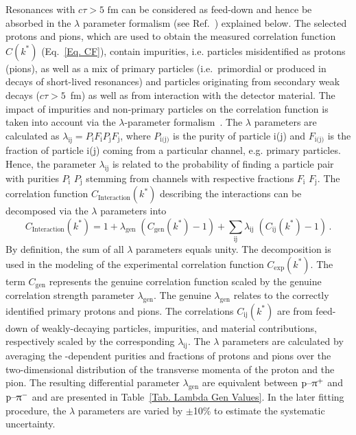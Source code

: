 \documentclass[ALICE,manyauthors]{cernphprep}
\begin{document}
Resonances with $c\tau>5\text{ fm}$ can be considered as feed-down and hence be absorbed in the $\lambda$ parameter formalism (see Ref.~\cite{ALICE:2023sjd}) explained below. The selected protons and pions, which are used to obtain the measured correlation function $C(k^*)$ (Eq.~\eqref{Eq. CF}), contain impurities, i.e. particles misidentified as protons (pions), as well as a mix of primary particles (i.e.~primordial or produced in decays of short-lived resonances) and particles originating from secondary weak decays ($c\tau > 5$~fm) as well as from interaction with the detector material. The impact of impurities and non-primary particles on the correlation function is taken into account via the $\lambda$-parameter formalism~\cite{ALICE:2018ysd}. The $\lambda$ parameters are calculated as $\lambda_{\text{ij}} = P_\text{i}F_\text{i}P_\text{j}F_\text{j}$, where $P_{\text{i(j)}}$ is the purity of particle i(j) and  $F_{\text{i(j)}}$ is the fraction of particle i(j) coming from a particular channel, e.g. primary particles. Hence, the parameter $\lambda_{\text{ij}}$ is related to the probability of finding a particle pair with purities $P_{\text{i}}$ $P_{\text{j}}$ stemming from channels with respective fractions $F_{\text{i}}$ $F_{\text{j}}$. The  correlation function $C_\text{Interaction}(k^*)$ describing the interactions can be decomposed via the $\lambda$ parameters into
\begin{equation}
    C_\text{Interaction}(k^*) = 1 + \lambda_{\text{gen}} \; (C_{\text{gen}}(k^*) - 1 ) + \sum_{\text{ij}} \lambda_{\text{ij}} \; (C_{\text{ij}}(k^*) - 1 ) \,.
\end{equation}
By definition, the sum of all $\lambda$ parameters equals unity. The decomposition is used in the modeling of the experimental correlation function $C_\text{exp}(k^*)$. The term $C_{\text{gen}}$ represents the genuine correlation function scaled by the genuine correlation strength parameter $\lambda_{\text{gen}}$. The genuine $\lambda_{\text{gen}}$ relates to the correctly identified primary protons and pions. The correlations $C_{\text{ij}}(k^*)$ are from feed-down of weakly-decaying particles, impurities, and material contributions, respectively scaled by the corresponding $\lambda_{\text{ij}}$. The $\lambda$ parameters are calculated by averaging the \ptText-dependent purities and fractions of protons and pions over the two-dimensional distribution of the transverse momenta of the proton and the pion. The resulting \mtText{} differential parameter $\lambda_{\text{gen}}$ are equivalent between $\text{p--}\uppi^+$ and $\text{p--}\uppi^-$ and are presented in Table~\ref{Tab. Lambda Gen Values}. In the later fitting procedure, the $\lambda$ parameters are varied by $\pm$10\% to estimate the systematic uncertainty.
\end{document}
